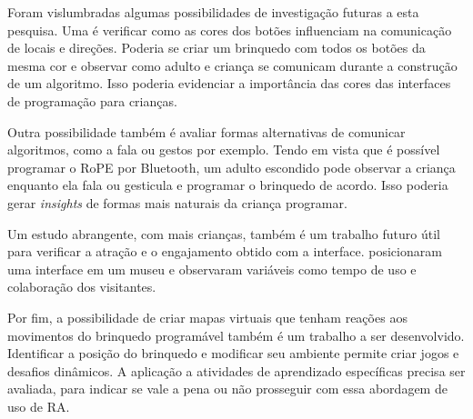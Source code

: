 
Foram vislumbradas algumas possibilidades de investigação futuras a esta pesquisa. Uma é verificar como as cores dos botões influenciam na comunicação de locais e direções. Poderia se criar um brinquedo com todos os botões da mesma cor e observar como adulto e criança se comunicam durante a construção de um algoritmo. Isso poderia evidenciar a importância das cores das interfaces de programação para crianças.

Outra possibilidade também é avaliar formas alternativas de comunicar algoritmos, como a fala ou gestos por exemplo. Tendo em vista que é possível programar o RoPE por Bluetooth, um adulto escondido pode observar a criança enquanto ela fala ou gesticula e programar o brinquedo de acordo. Isso poderia gerar \textit{insights} de formas mais naturais da criança programar.

Um estudo abrangente, com mais crianças, também é um trabalho futuro útil para verificar a atração e o engajamento obtido com a interface.  posicionaram uma interface em um museu e observaram variáveis como tempo de uso e colaboração dos visitantes.

Por fim, a possibilidade de criar mapas virtuais que tenham reações aos movimentos do brinquedo programável também é um trabalho a ser desenvolvido. Identificar a posição do brinquedo e modificar seu ambiente permite criar jogos e desafios dinâmicos. A aplicação a atividades de aprendizado específicas precisa ser avaliada, para indicar se vale a pena ou não prosseguir com essa abordagem de uso de \acl{RA}.